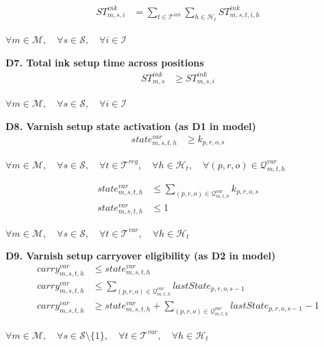\documentclass{article}
\begin{document}
\begin{align}
ST^{ink}_{m,s,i}
&=
\sum_{t \in \mathcal{T}^{ink}}
\sum_{h \in \mathcal{H}_t}
ST^{ink}_{m,s,t,i,h}
\label{eq:D6_ink_position_total}
\end{align}
\begin{center}
$\forall m \in \mathcal{M}, \quad
\forall s \in \mathcal{S}, \quad
\forall i \in \mathcal{I}$
\end{center}

\noindent\textbf{D7. Total ink setup time across positions}
\begin{align}
ST^{ink}_{m,s}
&\ge
ST^{ink}_{m,s,i}
\label{eq:D7_ink_total_lb}
\end{align}
\begin{center}
$\forall m \in \mathcal{M}, \quad
\forall s \in \mathcal{S}, \quad
\forall i \in \mathcal{I}$
\end{center}

\noindent\textbf{D8. Varnish setup state activation (as D1 in model)}
\begin{align}
state^{var}_{m,s,t,h}
&\ge
k_{p,r,o,s}
\label{eq:D8_var_state_lb}
\end{align}

\begin{center}
$\forall m \in \mathcal{M}, \quad
\forall s \in \mathcal{S}, \quad
\forall t \in \mathcal{T}^{reg}, \quad
\forall h \in \mathcal{H}_t, \quad
\forall (p,r,o) \in \mathcal{Q}^{var}_{m,t,h}$
\end{center}

\begin{align}
state^{var}_{m,s,t,h}
&\le
\sum_{(p,r,o) \in \mathcal{Q}^{var}_{m,t,h}}
k_{p,r,o,s}
\label{eq:D8_var_state_ub}
\\
state^{var}_{m,s,t,h}
&\le
1
\label{eq:D8_var_exclusivity}
\end{align}
\begin{center}
$\forall m \in \mathcal{M}, \quad
\forall s \in \mathcal{S}, \quad
\forall t \in \mathcal{T}^{var}, \quad
\forall h \in \mathcal{H}_t$
\end{center}

\noindent\textbf{D9. Varnish setup carryover eligibility  (as D2 in model)}
\begin{align}
carry^{var}_{m,s,t,h}
&\le
state^{var}_{m,s,t,h}
\label{eq:D9_var_carry_current_state}
\\
carry^{var}_{m,s,t,h}
&\le
\sum_{(p,r,o) \in \mathcal{Q}^{var}_{m,t,h}}
lastState_{p,r,o,s-1}
\label{eq:D9_var_carry_reference_ub}
\\
carry^{var}_{m,s,t,h}
&\ge
state^{var}_{m,s,t,h}
+
\sum_{(p,r,o) \in \mathcal{Q}^{var}_{m,t,h}}
lastState_{p,r,o,s-1}
- 1
\label{eq:D9_var_carry_reference_lb}
\end{align}
\begin{center}
$\forall m \in \mathcal{M}, \quad
\forall s \in \mathcal{S}\setminus\{1\}, \quad
\forall t \in \mathcal{T}^{var}, \quad
\forall h \in \mathcal{H}_t$
\end{center}
\end{document}
